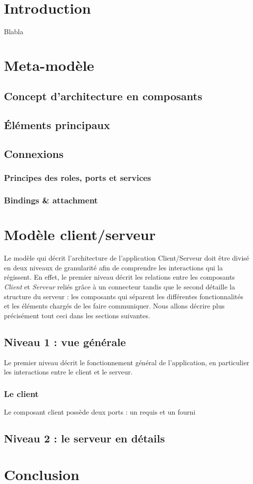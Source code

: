 \chapter*{Introduction}
	Blabla


\chapter{Meta-modèle}
	\section{Concept d'architecture en composants}
		
	
	
	\section{Éléments principaux}
		
	
	\section{Connexions}
		\subsection{Principes des roles, ports et services}
			
		\subsection{Bindings \& attachment}
			

\chapter{Modèle client/serveur}
		Le modèle qui décrit l'architecture de l'application Client/Serveur doit être divisé en deux niveaux de granularité afin de comprendre les interactions qui la régissent. En effet, le premier niveau décrit les relations entre les composants \textit{Client} et \textit{Serveur} reliés grâce à un connecteur tandis que le second détaille la structure du serveur : les composants qui séparent les différentes fonctionnalités et les éléments chargés de les faire communiquer. Nous allons décrire plus précisément tout ceci dans les sections suivantes.
		
	\section{Niveau 1 : vue générale}
		Le premier niveau décrit le fonctionnement général de l'application, en particulier les interactions entre le client et le serveur. 
		
		\subsection{Le client}
			Le composant client possède deux ports : un requis et un fourni
	\section{Niveau 2 : le serveur en détails}


\chapter*{Conclusion}
	
